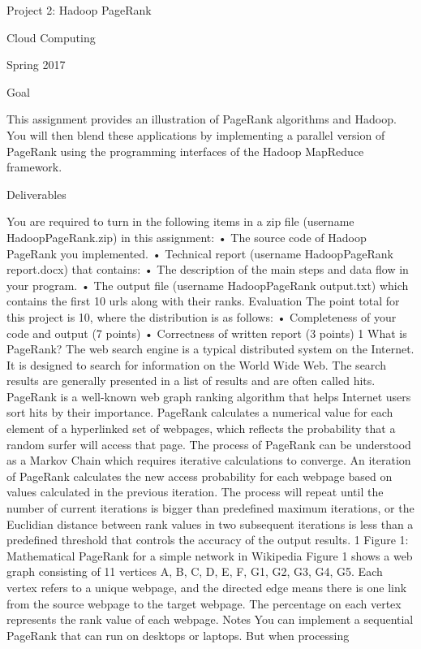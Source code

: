 Project 2: Hadoop PageRank

Cloud Computing

Spring 2017

Goal

This assignment provides an illustration of PageRank algorithms and Hadoop. You will then blend these
applications by implementing a parallel version of PageRank using the programming interfaces of the Hadoop
MapReduce framework.

Deliverables

You are required to turn in the following items in a zip file (username HadoopPageRank.zip) in this assignment:
• The source code of Hadoop PageRank you implemented.
• Technical report (username HadoopPageRank report.docx) that contains:
• The description of the main steps and data flow in your program.
• The output file (username HadoopPageRank output.txt) which contains the first 10 urls along with
their ranks.
Evaluation
The point total for this project is 10, where the distribution is as follows:
• Completeness of your code and output (7 points)
• Correctness of written report (3 points)
1 What is PageRank?
The web search engine is a typical distributed system on the Internet. It is designed to search for information
on the World Wide Web. The search results are generally presented in a list of results and are often called
hits. PageRank is a well-known web graph ranking algorithm that helps Internet users sort hits by their
importance.
PageRank calculates a numerical value for each element of a hyperlinked set of webpages, which reflects
the probability that a random surfer will access that page. The process of PageRank can be understood as a
Markov Chain which requires iterative calculations to converge. An iteration of PageRank calculates the new
access probability for each webpage based on values calculated in the previous iteration. The process will
repeat until the number of current iterations is bigger than predefined maximum iterations, or the Euclidian
distance between rank values in two subsequent iterations is less than a predefined threshold that controls
the accuracy of the output results.
1
Figure 1: Mathematical PageRank for a simple network in Wikipedia
Figure 1 shows a web graph consisting of 11 vertices A, B, C, D, E, F, G1, G2, G3, G4, G5. Each vertex
refers to a unique webpage, and the directed edge means there is one link from the source webpage to the
target webpage. The percentage on each vertex represents the rank value of each webpage.
Notes
You can implement a sequential PageRank that can run on desktops or laptops. But when processing
